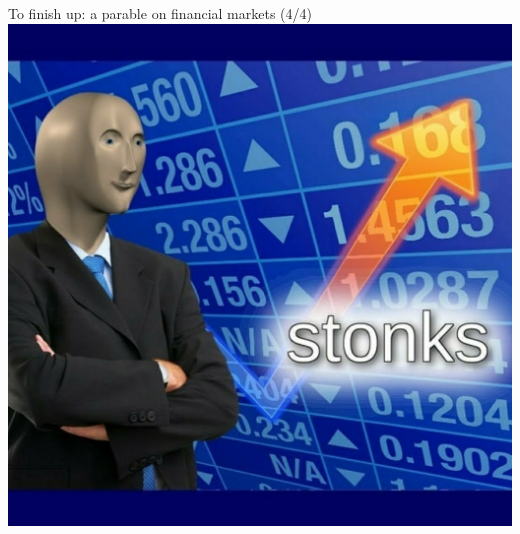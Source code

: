 \documentclass[english,10pt]{beamer}
\theoremstyle{definition}
\begin{document}
\begin{frame}{To finish up: a parable on financial markets (4/4)}
	\centering \includegraphics[width=0.6\paperwidth]{pics/yy4}
\end{frame}
\end{document}
